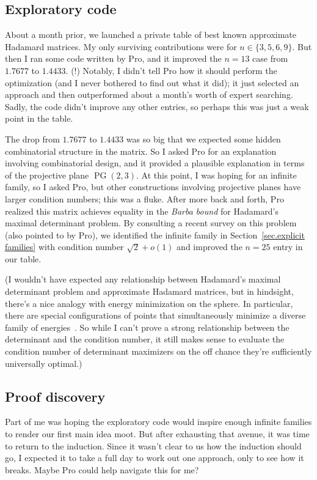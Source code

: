 \documentclass[11pt]{article}
\theoremstyle{plain}
\theoremstyle{definition}
\begin{document}
\subsection{Exploratory code}

About a month prior, we launched a private table of best known approximate Hadamard matrices. 
My only surviving contributions were for $n\in\{3,5,6,9\}$.
But then I ran some code written by Pro, and it improved the $n=13$ case from $1.7677$ to $1.4433$. (!) 
Notably, I didn't tell Pro how it should perform the optimization (and I never bothered to find out what it did); it just selected an approach and then outperformed about a month's worth of expert searching. 
Sadly, the code didn't improve any other entries, so perhaps this was just a weak point in the table.

The drop from $1.7677$ to $1.4433$ was so big that we expected some hidden combinatorial structure in the matrix. 
So I asked Pro for an explanation involving combinatorial design, and it provided a plausible explanation in terms of the projective plane $\operatorname{PG}(2,3)$.
At this point, I was hoping for an infinite family, so I asked Pro, but other constructions involving projective planes have larger condition numbers; this was a fluke.
After more back and forth, Pro realized this matrix achieves equality in the \textit{Barba bound} for Hadamard's maximal determinant problem. 
By consulting a recent survey on this problem~\cite{BrowneEHC:21} (also pointed to by Pro), we identified the infinite family in Section~\ref{sec.explicit families} with condition number $\sqrt{2}+o(1)$ and improved the $n=25$ entry in our table.

(I wouldn't have expected any relationship between Hadamard's maximal determinant problem and approximate Hadamard matrices, but in hindsight, there's a nice analogy with energy minimization on the sphere.
In particular, there are special configurations of points that simultaneously minimize a diverse family of energies~\cite{CohnK:07}.
So while I can't prove a strong relationship between the determinant and the condition number, it still makes sense to evaluate the condition number of determinant maximizers on the off chance they're sufficiently universally optimal.)

\subsection{Proof discovery}

Part of me was hoping the exploratory code would inspire enough infinite families to render our first main idea moot.
But after exhausting that avenue, it was time to return to the induction.
Since it wasn't clear to us how the induction should go, I expected it to take a full day to work out one approach, only to see how it breaks. 
Maybe Pro could help navigate this for me?
\end{document}
